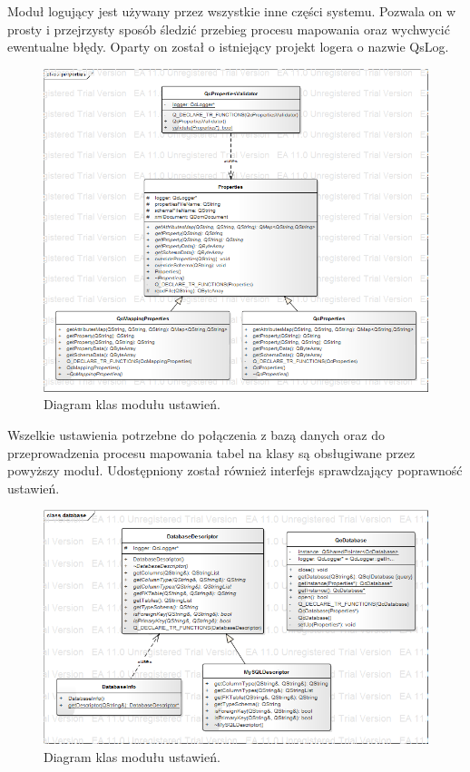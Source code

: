 \documentclass[12pt]{report}
\begin{document}
Moduł logujący jest używany przez wszystkie inne części systemu. Pozwala on w prosty i przejrzysty sposób śledzić przebieg procesu mapowania oraz wychwycić ewentualne błędy. Oparty on został o istniejący projekt logera o nazwie QsLog. 

\begin{figure}[h]
	\centering
	\includegraphics[width=1.1\textwidth]{images/properties.png}
	\caption{Diagram klas modułu ustawień.}
\end{figure}
\FloatBarrier	

Wszelkie ustawienia potrzebne do połączenia z bazą danych oraz do przeprowadzenia procesu mapowania tabel na klasy są obsługiwane przez powyższy moduł. Udostępniony został również interfejs sprawdzający poprawność ustawień.

\begin{figure}[h]
	\centering
	\includegraphics[width=1.1\textwidth]{images/database.png}
	\caption{Diagram klas modułu ustawień.}
\end{figure}
\FloatBarrier	
\end{document}
